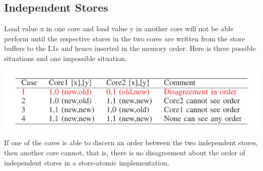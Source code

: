 \documentclass[10pt,a4paper]{article}
\begin{document}
\subsection{Independent Stores}
Load value x in one core and load value y in another core will not be able perform until the respective stores in the two cores are written from the store buffers to the L1s and hence inserted in the memory order. Here is three possible situations and one impossible situation.
\begin{center}
	\includegraphics[scale = 0.4]{2.png}
\end{center}  
If one of the cores is able to discern an order between the two independent stores, then another core cannot, that is, there is no disagreement about the order of independent stores in a store-atomic implementation.
\end{document}
